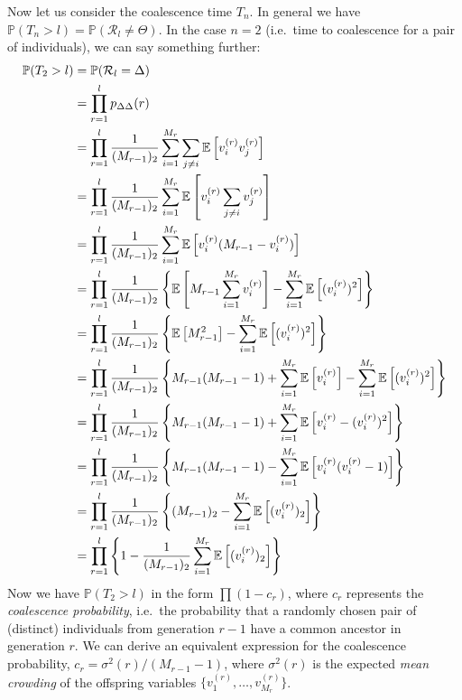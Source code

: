 \documentclass{article}
\newcommand{\E}{\mathbb{E}}
\newcommand{\PR}{\mathbb{P}}
\begin{document}
Now let us consider the coalescence time $T_n$. In general we have $\PR(T_n>l)=\PR(\mathcal{R}_l \neq \Theta)$. In the case $n=2$ (i.e.\ time to coalescence for a pair of individuals), we can say something further:
\begin{align}
\PR(T_2>l) &= \PR(\mathcal{R}_l = \Delta) \notag\\
&= \prod_{r=1}^l p_{\Delta\Delta}(r) \notag\\
&= \prod_{r=1}^l \frac{1}{(M_{r-1})_2} \sum_{i=1}^{M_r} \sum_{j \neq i} \E\left[v_i^{(r)}v_j^{(r)}\right] \notag\\
&= \prod_{r=1}^l \frac{1}{(M_{r-1})_2} \sum_{i=1}^{M_r} \E\left[v_i^{(r)}\sum_{j \neq i}v_j^{(r)}\right] \notag\\
&= \prod_{r=1}^l \frac{1}{(M_{r-1})_2} \sum_{i=1}^{M_r} \E\left[v_i^{(r)}(M_{r-1}-v_i^{(r)})\right] \\
&= \prod_{r=1}^l \frac{1}{(M_{r-1})_2} \left\{ \E \left[M_{r-1}\sum_{i=1}^{M_r}v_i^{(r)}\right]  - \sum_{i=1}^{M_r} \E \left[(v_i^{(r)})^2\right]\right\} \notag\\
&= \prod_{r=1}^l \frac{1}{(M_{r-1})_2} \left\{ \E \left[M_{r-1}^2\right]  - \sum_{i=1}^{M_r} \E \left[(v_i^{(r)})^2\right]\right\} \notag\\
&= \prod_{r=1}^l \frac{1}{(M_{r-1})_2} \left\{M_{r-1}(M_{r-1}-1) + \sum_{i=1}^{M_r} \E \left[v_i^{(r)}\right]  - \sum_{i=1}^{M_r} \E \left[(v_i^{(r)})^2\right]\right\} \notag\\
&= \prod_{r=1}^l \frac{1}{(M_{r-1})_2} \left\{M_{r-1}(M_{r-1}-1) + \sum_{i=1}^{M_r} \E \left[v_i^{(r)} - (v_i^{(r)})^2\right]\right\} \notag\\
&= \prod_{r=1}^l \frac{1}{(M_{r-1})_2} \left\{M_{r-1}(M_{r-1}-1) - \sum_{i=1}^{M_r} \E \left[v_i^{(r)}(v_i^{(r)}-1)\right]\right\} \notag\\
&= \prod_{r=1}^l \frac{1}{(M_{r-1})_2} \left\{ (M_{r-1})_2 - \sum_{i=1}^{M_r} \E \left[(v_i^{(r)})_2\right]\right\} \notag\\
&= \prod_{r=1}^l \left\{ 1- \frac{1}{(M_{r-1})_2}  \sum_{i=1}^{M_r} \E \left[(v_i^{(r)})_2\right]\right\} \label{eq:coal_prob_prod}
\end{align}
Now we have $\PR(T_2>l)$ in the form $\prod (1-c_r)$, where $c_r$ represents the \emph{coalescence probability}, i.e.\ the probability that a randomly chosen pair of (distinct) individuals from generation $r-1$ have a common ancestor in generation $r$.
We can derive an equivalent expression for the coalescence probability, $c_r= \sigma^2(r) / (M_{r-1}-1)$, where $\sigma^2(r)$ is the expected \emph{mean crowding} of the offspring variables $\{ v_1^{(r)},\dots,v_{M_r}^{(r)} \}$.
\end{document}
